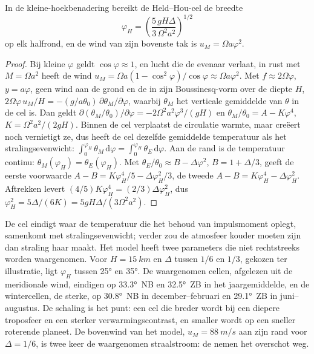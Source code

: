 \begin{theorem}\label{thm:b3:atmospheric-dynamics:held-hou}
In de kleine-hoekbenadering bereikt de Held--Hou-cel de breedte
\[
\varphi_H = \left(\frac{5\,gH\Delta}{3\,\Omega^2a^2}\right)^{1/2}
\]
op elk halfrond, en de wind van zijn bovenste tak is $u_M = \Omega
a\varphi^2$.
\end{theorem}

\begin{proof}
Bij kleine $\varphi$ geldt $\cos\varphi \approx 1$, en lucht die de evenaar verlaat,
in rust met $M = \Omega a^2$ heeft de wind $u_M = \Omega a(1 - \cos^2\varphi)/\cos\varphi
\approx \Omega a\varphi^2$. Met $f \approx 2\Omega\varphi$, $y = a\varphi$,
geen wind aan de grond en de  in zijn Boussinesq-vorm over de
diepte $H$, $2\Omega\varphi\,u_M/H = -(g/a\theta_0)\,\partial\theta_M/
\partial\varphi$, waarbij $\theta_M$ het verticale gemiddelde van $\theta$ in de
cel is. Dan geldt $\partial(\theta_M/\theta_0)/\partial\varphi = -2\Omega^2a^2
\varphi^3/(gH)$ en $\theta_M/\theta_0 = A - K\varphi^4$, $K = \Omega^2a^2/
(2gH)$. Binnen de cel verplaatst de circulatie warmte, maar creëert noch
vernietigt ze, dus heeft de cel dezelfde gemiddelde temperatuur als het
stralingsevenwicht: $\int_0^{\varphi_H}\theta_M\,\mathrm d\varphi = \int_0^{\varphi_H}
\theta_E\,\mathrm d\varphi$. Aan de rand is de temperatuur continu:
$\theta_M(\varphi_H) = \theta_E(\varphi_H)$. Met $\theta_E/\theta_0 \approx
B - \Delta\varphi^2$, $B = 1 + \Delta/3$, geeft de eerste voorwaarde $A - B =
K\varphi_H^4/5 - \Delta\varphi_H^2/3$, de tweede $A - B = K\varphi_H^4 -
\Delta\varphi_H^2$. Aftrekken levert $(4/5)K\varphi_H^4 = (2/3)\Delta
\varphi_H^2$, dus $\varphi_H^2 = 5\Delta/(6K) = 5gH\Delta/(3\Omega^2a^2)$.
\end{proof}

De cel eindigt waar de temperatuur die het behoud van impulsmoment
oplegt, samenkomt met stralingsevenwicht; verder zou de atmosfeer kouder
moeten zijn dan straling haar maakt. Het model heeft twee parameters die
niet rechtstreeks worden waargenomen. Voor $H = \qty{15}{km}$ en $\Delta$ tussen $1/6$ en
$1/3$, gekozen ter illustratie, ligt $\varphi_H$ tussen \ang{25} en \ang{35}. De
waargenomen cellen, afgelezen uit de  meridionale wind, eindigen op
\ang{33.3}~NB en \ang{32.5}~ZB in het jaargemiddelde, en de wintercellen,
de sterke, op \ang{30.8}~NB in december--februari en \ang{29.1}~ZB in
juni--augustus. De schaling is het punt: een cel die breder wordt bij een
diepere troposfeer en een sterker verwarmingscontrast, en smaller wordt op een
sneller roterende planeet. De bovenwind van het model, $u_M =
\qty{88}{m/s}$ aan zijn rand voor $\Delta = 1/6$, is twee keer de waargenomen straalstroom:
de  nemen het overschot weg.

